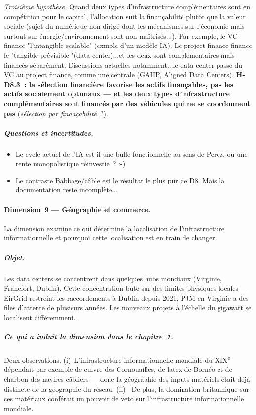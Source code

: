\emph{Troisi\`eme hypoth\`ese.} Quand deux types d'infrastructure compl\'ementaires sont en comp\'etition pour le capital, l'allocation suit la finan\c{c}abilit\'e plut\^ot que la valeur sociale (sujet du numérique non dirigé dont les mécanismes sur l'économie mais surtout sur énergie/environnement sont non maîtrisés...). Par exemple, le VC finance "l'intangible scalable" (exmple d'un mod\`ele IA). Le project finance finance le "tangible pr\'evisible "(data center)...et les deux sont compl\'ementaires mais financ\'es s\'epar\'ement. Discussions actuelles notamment...le data center passe du VC au project finance, comme une centrale (GAIIP, Aligned Data Centers). \textbf{H-D8.3~: la s\'election financi\`ere favorise les actifs finan\c{c}ables, pas les actifs socialement optimaux --- et les deux types d'infrastructure compl\'ementaires sont financ\'es par des v\'ehicules qui ne se coordonnent pas} (\emph{s\'election par finan\c{c}abilit\'e}~?).

\subparagraph{Questions et incertitudes.}
\begin{itemize}
\item Le cycle actuel de l'IA est-il une bulle fonctionnelle au sens de Perez, ou une rente monopolistique r\'einvestie~? :-)
\item Le contraste Babbage/c\^able est le r\'esultat le plus pur de D8. Mais la documentation reste incompl\`ete...
\end{itemize}


\paragraph{Dimension~9 --- G\'eographie et commerce.}
La dimension examine ce qui d\'etermine la localisation de l'infrastructure informationnelle et pourquoi cette localisation est en train de changer.

\subparagraph{Objet.}
Les data centers se concentrent dans quelques hubs mondiaux (Virginie, Francfort, Dublin). Cette concentration bute sur des limites physiques locales --- EirGrid restreint les raccordements \`a Dublin depuis 2021, PJM en Virginie a des files d'attente de plusieurs ann\'ees. Les nouveaux projets \`a l'\'echelle du gigawatt se localisent diff\'eremment.

\subparagraph{Ce qui a induit la dimension dans le chapitre~1.}
Deux observations. (i)~L'infrastructure informationnelle mondiale du XIX\textsuperscript{e} d\'ependait par exemple de cuivre des Cornouailles, de latex de Bornéo et de charbon des navires c\^abliers --- donc la g\'eographie des inputs mat\'eriels \'etait d\'ej\`a distincte de la g\'eographie du r\'eseau. (ii)~ De plus, la domination britannique sur ces mat\'eriaux conf\'erait un pouvoir de veto sur l'infrastructure informationnelle mondiale.

